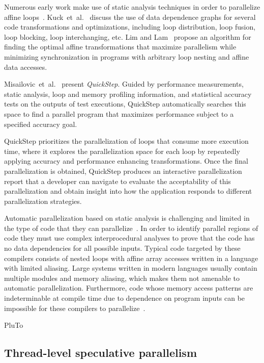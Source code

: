 \documentclass[a4paper,12pt]{article}
\newcommand{\etal}{et~al.}
\begin{document}
Numerous early work make use of static analysis techniques in order to
parallelize affine loops~\cite{kuck81,padua93,blume94,lim97}.
Kuck~\etal~\cite{kuck81} discuss the use of data dependence graphs for several
code transformations and optimizations, including loop distribution, loop
fusion, loop blocking, loop interchanging, etc.  Lim and Lam~\cite{lim97}
propose an algorithm for finding the optimal affine transformations that
maximize parallelism while minimizing synchronization in programs with
arbitrary loop nesting and affine data accesses.

Misailovic~\etal~\cite{misailovic13} present {\em QuickStep}. Guided by
performance measurements, static analysis, loop and memory profiling
information, and statistical accuracy tests on the outputs of test executions,
QuickStep automatically searches this space to find a parallel program that
maximizes performance subject to a specified accuracy goal.

QuickStep prioritizes the parallelization of loops that consume more execution
time, where it explores the parallelization space for each loop by repeatedly
applying accuracy and performance enhancing transformations.  Once the final
parallelization is obtained, QuickStep produces an interactive parallelization
report that a developer can navigate to evaluate the acceptability of this
parallelization and obtain insight into how the application responds to
different parallelization strategies.

Automatic parallelization based on static analysis is challenging and limited
in the type of code that they can
parallelize~\cite{bruening98,kennedy01,chen03}.  In order to identify parallel
regions of code they must use complex interprocedural analyses to prove that
the code has no data dependencies for all possible inputs.  Typical code
targeted by these compilers consists of nested loops with affine array accesses
written in a language with limited aliasing.  Large systems written in modern
languages usually contain multiple modules and memory aliasing, which makes
them not amenable to automatic parallelization.  Furthermore, code whose memory
access patterns are indeterminable at compile time due to dependence on program
inputs can be impossible for these compilers to parallelize~\cite{bruening98}.

PluTo~\cite{bondhugula08}

\subsection{Thread-level speculative parallelism}
\end{document}
